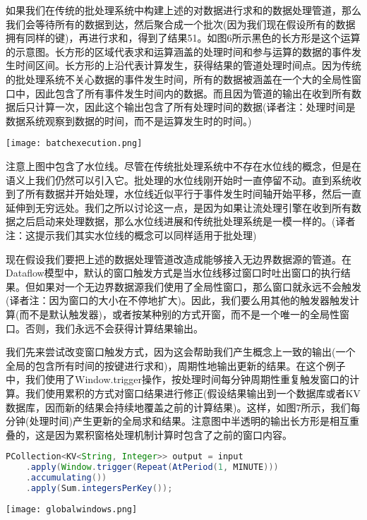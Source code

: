 \documentclass[oneside]{ctexbook}
\begin{document}
如果我们在传统的批处理系统中构建上述的对数据进行求和的数据处理管道，那么我们会等待所有的数据到达，然后聚合成一个批次(因为我们现在假设所有的数据拥有同样的键)，再进行求和，得到了结果51。如图6所示黑色的长方形是这个运算的示意图。长方形的区域代表求和运算涵盖的处理时间和参与运算的数据的事件发生时间区间。长方形的上沿代表计算发生，获得结果的管道处理时间点。因为传统的批处理系统不关心数据的事件发生时间，所有的数据被涵盖在一个大的全局性窗口中，因此包含了所有事件发生时间内的数据。而且因为管道的输出在收到所有数据后只计算一次，因此这个输出包含了所有处理时间的数据(译者注：处理时间是数据系统观察到数据的时间，而不是运算发生时的时间。)

\noindent \texttt{[image: batchexecution.png]}

注意上图中包含了水位线。尽管在传统批处理系统中不存在水位线的概念，但是在语义上我们仍然可以引入它。批处理的水位线刚开始时一直停留不动。直到系统收到了所有数据并开始处理，水位线近似平行于事件发生时间轴开始平移，然后一直延伸到无穷远处。我们之所以讨论这一点，是因为如果让流处理引擎在收到所有数据之后启动来处理数据，那么水位线进展和传统批处理系统是一模一样的。(译者注：这提示我们其实水位线的概念可以同样适用于批处理)

现在假设我们要把上述的数据处理管道改造成能够接入无边界数据源的管道。在Dataflow模型中，默认的窗口触发方式是当水位线移过窗口时吐出窗口的执行结果。但如果对一个无边界数据源我们使用了全局性窗口，那么窗口就永远不会触发(译者注：因为窗口的大小在不停地扩大)。因此，我们要么用其他的触发器触发计算(而不是默认触发器)，或者按某种别的方式开窗，而不是一个唯一的全局性窗口。否则，我们永远不会获得计算结果输出。

我们先来尝试改变窗口触发方式，因为这会帮助我们产生概念上一致的输出(一个全局的包含所有时间的按键进行求和)，周期性地输出更新的结果。在这个例子中，我们使用了Window.trigger操作，按处理时间每分钟周期性重复触发窗口的计算。我们使用累积的方式对窗口结果进行修正(假设结果输出到一个数据库或者KV数据库，因而新的结果会持续地覆盖之前的计算结果)。这样，如图7所示，我们每分钟(处理时间)产生更新的全局求和结果。注意图中半透明的输出长方形是相互重叠的，这是因为累积窗格处理机制计算时包含了之前的窗口内容。

\begin{lstlisting}[language=java]
PCollection<KV<String, Integer>> output = input
    .apply(Window.trigger(Repeat(AtPeriod(1, MINUTE)))
    .accumulating())
    .apply(Sum.integersPerKey());
\end{lstlisting}

\noindent \texttt{[image: globalwindows.png]}
\end{document}
